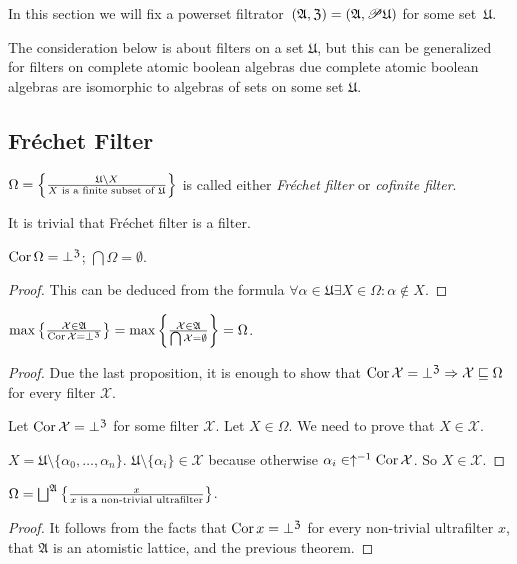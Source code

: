 In this section we will fix a powerset filtrator~$(\mathfrak{A},\mathfrak{Z})=(\mathfrak{A},\mathscr{P}\mathfrak{U})$
for some set~$\mathfrak{U}$.

The consideration below is about filters on a set $\mathfrak{U}$,
but this can be generalized for filters on complete atomic boolean
algebras due complete atomic boolean algebras are isomorphic to algebras
of sets on some set $\mathfrak{U}$.


\subsection{Fr\'echet Filter}
\begin{defn}
$\Omega=\left\{ \frac{\mathfrak{U}\setminus X}{X\text{ is a finite subset of }\mathfrak{U}}\right\}$
is called either \emph{Fr\'echet filter} or \emph{cofinite filter}.
\end{defn}
It is trivial that Fr\'echet filter is a filter.
\begin{prop}
$\operatorname{Cor}\Omega=\bot^{\mathfrak{Z}}$; $\bigcap\Omega=\emptyset$.\end{prop}
\begin{proof}
This can be deduced from the formula $\forall\alpha\in\mathfrak{U}\exists X\in\Omega:\alpha\notin X$.\end{proof}
\begin{thm}
$\max\left\{ \frac{\mathcal{X}\in\mathfrak{A}}{\operatorname{Cor}\mathcal{X}=\bot^{\mathfrak{Z}}}\right\}=\max\left\{ \frac{\mathcal{X}\in\mathfrak{A}}{\bigcap\mathcal{X}=\emptyset}\right\}=\Omega$.\end{thm}
\begin{proof}
Due the last proposition, it is enough to show that $\operatorname{Cor}\mathcal{X}=\bot^{\mathfrak{Z}}\Rightarrow\mathcal{X}\sqsubseteq\Omega$
for every filter $\mathcal{X}$.

Let $\operatorname{Cor}\mathcal{X}=\bot^{\mathfrak{Z}}$ for some filter $\mathcal{X}$.
Let $X\in\Omega$. We need to prove that $X\in\mathcal{X}$.

$X=\mathfrak{U}\setminus\{\alpha_{0},\dots,\alpha_{n}\}$. $\mathfrak{U}\setminus\{\alpha_{i}\}\in\mathcal{X}$
because otherwise $\alpha_{i}\in\uparrow^{-1}\operatorname{Cor}\mathcal{X}$. So
$X\in\mathcal{X}$.\end{proof}
\begin{thm}
$\Omega=\bigsqcup^{\mathfrak{A}}\setcond x{x\text{ is a non-trivial ultrafilter}}$.\end{thm}
\begin{proof}
It follows from the facts that $\operatorname{Cor} x=\bot^{\mathfrak{Z}}$ for every
non-trivial ultrafilter $x$, that $\mathfrak{A}$ is an atomistic
lattice, and the previous theorem.\end{proof}
